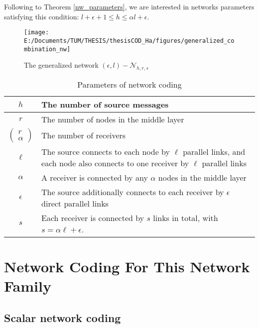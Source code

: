 \begin{rem}
Following to Theorem \ref{nw_parameters}, we are interested in networks
parameters satisfying this condition: $l+\epsilon+1\leq h\leq\alpha l+\epsilon$.
\end{rem}
\begin{figure}[H]
\caption{The generalized network $(\epsilon,l)-\mathcal{N}_{h,r,s}$\label{fig:The-generalized-network}}

\texttt{[image: E:/Documents/TUM/THESIS/thesisCOD\_Ha/figures/generalized\_combination\_nw]}
\end{figure}

\begin{table}[H]
\caption{Parameters of network coding \label{tab:Parameters-of-network}}

\begin{tabular}{c|>{\centering}p{0.48\paperwidth}}
$h$ & The number of source messages\tabularnewline
\hline 
$r$ & The number of nodes in the middle layer\tabularnewline
\hline 
$\left(\begin{array}{c}
r\\
\alpha
\end{array}\right)$ & The number of receivers\tabularnewline
\hline 
$\ell$ & The source connects to each node by $\ell$ parallel links, and each
node also connects to one receiver by $\ell$ parallel links\tabularnewline
\hline 
$\alpha$ & A receiver is connected by any $\alpha$ nodes in the middle layer\tabularnewline
\hline 
$\epsilon$ & The source additionally connects to each receiver by $\epsilon$ direct
parallel links\tabularnewline
\hline 
$s$ & Each receiver is connected by $s$ links in total, with $s=\alpha\ell+\epsilon$.\tabularnewline
\end{tabular}
\end{table}


\section{Network Coding For This Network Family}

\subsection{Scalar network coding \label{subsec:Scalar-network-coding}}


